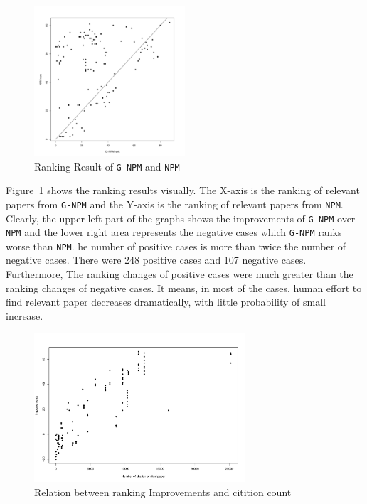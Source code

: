 \documentclass{llncs}
\newcommand{\name}{\texttt{G-NPM}\xspace}
\newcommand{\npm}{\texttt{NPM}\xspace}
\begin{document}
\begin{figure}[ht]
\centering
\includegraphics[width= 0.5\textwidth]{rq1.pdf}
\caption{Ranking Result of \name and \npm \label{fig:rq1}}
\end{figure}

Figure~\ref{fig:rq1} shows the ranking results visually. The X-axis is the ranking of relevant papers from \name and the Y-axis is the ranking of relevant papers from \npm. Clearly, the upper left part of the graphs shows the improvements of \name over \npm and the lower right area represents the negative cases which \name ranks worse than \npm. he number of positive cases is more than twice the number of negative cases. There were 248 positive cases and 107 negative cases. Furthermore, The ranking changes of positive cases were much greater than the ranking changes of negative cases. It means, in most of the cases, human effort to find relevant paper decreases dramatically, with little probability of small increase.

\begin{figure}[ht]
\centering
\includegraphics[width= 0.7\textwidth]{rq1_2.pdf}
\caption{Relation between ranking Improvements and citition count \label{fig:rq1_2}}
\end{figure}
\end{document}
